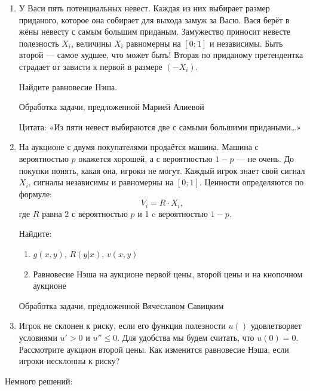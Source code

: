 \begin{enumerate}
\item У Васи пять потенциальных невест. Каждая из них выбирает размер приданого, которое она собирает для выхода замуж за Васю. Вася берёт в жёны невесту с самым большим приданым. Замужество приносит невесте полезность $X_{i}$, величины $X_{i}$ равномерны на $[0;1]$ и независимы. Быть второй — самое худшее, что может быть! Вторая по приданому претендентка страдает от зависти к первой в размере $(-X_{i})$.

Найдите равновесие Нэша.


Обработка задачи, предложенной Марией Алиевой

Цитата: «Из пяти невест выбираются две с самыми большими придаными\ldots»

\item На аукционе с двумя покупателями продаётся машина. Машина с вероятностью $p$ окажется хорошей, а с вероятностью $1-p$ — не очень. До покупки понять, какая она, игроки не могут. Каждый игрок знает свой сигнал $X_{i}$, сигналы независимы и равномерны на $[0;1]$. Ценности определяются по формуле:
\begin{equation}
V_{i}=R\cdot X_{i},
\end{equation}
где $R$ равна 2 с вероятностью $p$ и 1 c вероятностью $1-p$.

Найдите:
\begin{enumerate}
\item $g(x,y)$, $R(y|x)$, $v(x,y)$
\item Равновесие Нэша на аукционе первой цены, второй цены и на кнопочном аукционе
\end{enumerate}

Обработка задачи, предложенной Вячеславом Савицким

\item Игрок не склонен к риску, если его функция полезности $u()$ удовлетворяет условиями $ u'>0 $ и $ u''\leq 0 $. Для удобства мы будем считать, что $u(0)=0$. Рассмотрите аукцион второй цены. Как изменится равновесие Нэша, если игроки несклонны к риску?


\end{enumerate}



Немного решений:

